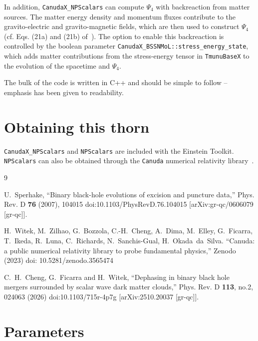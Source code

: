 In addition, \texttt{CanudaX\_NPScalars} can compute $\Psi_{4}$ with backreaction from matter sources.
The matter energy density and momentum fluxes contribute to the gravito-electric and gravito-magnetic fields, which are then used to construct $\Psi_{4}$ (cf. Eqs. (21a) and (21b) of~\cite{Cheng:2025wac}).
The option to enable this backreaction is controlled by the boolean parameter \texttt{CanudaX\_BSSNMoL::stress\_energy\_state}, which adds matter contributions from the stress-energy tensor in \texttt{TmunuBaseX} to the evolution of the spacetime and $\Psi_{4}$.

The bulk of the code is written in C++ and should be simple to follow -- emphasis has been given to readability.

\section{Obtaining this thorn}

\texttt{CanudaX\_NPScalars} and \texttt{NPScalars} are included with the Einstein Toolkit.
\texttt{NPScalars} can also be obtained through the \texttt{Canuda} numerical relativity library~\cite{Canuda}.


\begin{thebibliography}{9}

U.~Sperhake,
``Binary black-hole evolutions of excision and puncture data,''
Phys. Rev. D \textbf{76} (2007), 104015
doi:10.1103/PhysRevD.76.104015
[arXiv:gr-qc/0606079 [gr-qc]].

H.~Witek, M.~Zilhao, G.~Bozzola, C.-H.~Cheng, A.~Dima, M.~Elley, G.~Ficarra, T.~Ikeda, R.~Luna, C.~Richards, N.~Sanchis-Gual, H.~Okada~da~Silva.
``Canuda: a public numerical relativity library to probe fundamental physics,''
Zenodo (2023)
doi: 10.5281/zenodo.3565474

C.~H.~Cheng, G.~Ficarra and H.~Witek,
``Dephasing in binary black hole mergers surrounded by scalar wave dark matter clouds,''
Phys. Rev. D \textbf{113}, no.2, 024063 (2026)
doi:10.1103/715r-4p7g
[arXiv:2510.20037 [gr-qc]].

\end{thebibliography}




\section{Parameters} 


